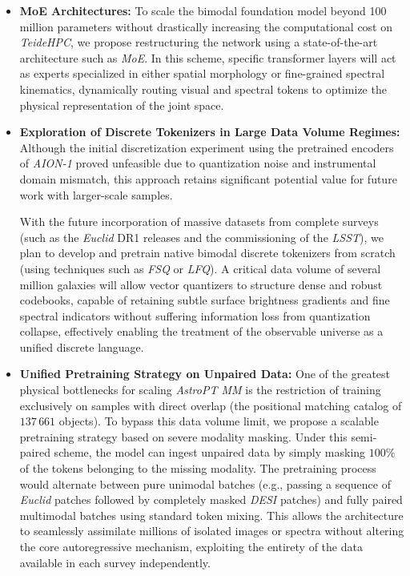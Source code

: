 \begin{itemize}
	\item \textbf{\gls{MoE} Architectures:} 
	To scale the bimodal foundation model beyond 100 million parameters without drastically increasing the computational cost on \textit{TeideHPC}, we propose restructuring the network using a state-of-the-art architecture such as \textit{\gls{MoE}}. In this scheme, specific transformer layers will act as experts specialized in either spatial morphology or fine-grained spectral kinematics, dynamically routing visual and spectral tokens to optimize the physical representation of the joint space.
	
		
	\item \textbf{Exploration of Discrete Tokenizers in Large Data Volume Regimes:} 
	Although the initial discretization experiment using the pretrained encoders of \textit{AION-1} proved unfeasible due to quantization noise and instrumental domain mismatch, this approach retains significant potential value for future work with larger-scale samples. 

	With the future incorporation of massive datasets from complete surveys (such as the \textit{Euclid} DR1 releases and the commissioning of the \textit{\gls{LSST}}), we plan to develop and pretrain native bimodal discrete tokenizers from scratch (using techniques such as \textit{\gls{FSQ}} or \textit{\gls{LFQ}}). A critical data volume of several million galaxies will allow vector quantizers to structure dense and robust codebooks, capable of retaining subtle surface brightness gradients and fine spectral indicators without suffering information loss from quantization collapse, effectively enabling the treatment of the observable universe as a unified discrete language.
	
	\item \textbf{Unified Pretraining Strategy on Unpaired Data:} 
	One of the greatest physical bottlenecks for scaling \textit{AstroPT MM} is the restriction of training exclusively on samples with direct overlap (the positional matching catalog of $137\,661$ objects). To bypass this data volume limit, we propose a scalable pretraining strategy based on severe modality masking. Under this semi-paired scheme, the model can ingest unpaired data by simply masking $100\%$ of the tokens belonging to the missing modality. The pretraining process would alternate between pure unimodal batches (e.g., passing a sequence of \textit{Euclid} patches followed by completely masked \textit{\gls{DESI}} patches) and fully paired multimodal batches using standard token mixing. This allows the architecture to seamlessly assimilate millions of isolated images or spectra without altering the core autoregressive mechanism, exploiting the entirety of the data available in each survey independently.
\end{itemize}